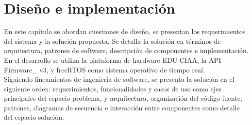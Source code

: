 \chapter{Diseño e implementación} %
\label{Chapter3} %

En este capítulo se abordan cuestiones de diseño, se presentan los requerimientos del sistema y la solución propuesta. Se detalla la solución en términos de arquitectura, patrones de software, descripción de componentes e implementación. En el desarrollo se utiliza la plataforma de hardware EDU-CIAA\citep{CIAA}, la API Firmware\_ v3\citep{firmwarev3}, y freeRTOS\citep{freeRTOS} como sistema operativo de tiempo real.\\

Siguiendo lineamientos de ingeniería de software, se presenta la solución en el siguiente orden: requerimientos, funcionalidades y casos de uso como ejes principales del espacio problema, y arquitectura, organización del código fuente, patrones, diagramas de secuencia e interacción entre componentes como detalle del espacio solución.\\




